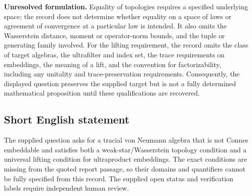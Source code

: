 \documentclass[11pt]{article}
\begin{document}
\textbf{Unresolved formulation.} Equality of topologies requires a specified underlying space; the record does not determine whether equality on a space of laws or agreement of convergence at a particular law is intended. It also omits the Wasserstein distance, moment or operator-norm bounds, and the tuple or generating family involved. For the lifting requirement, the record omits the class of target algebras, the ultrafilter and index set, the trace requirements on embeddings, the meaning of a lift, and the convention for factorizability, including any unitality and trace-preservation requirements. Consequently, the displayed question preserves the supplied target but is not a fully determined mathematical proposition until these qualifications are recovered.
\subsection{Short English statement}
The supplied question asks for a tracial von Neumann algebra that is not Connes embeddable and satisfies both a weak-star/Wasserstein topology condition and a universal lifting condition for ultraproduct embeddings. The exact conditions are missing from the quoted report passage, so their domains and quantifiers cannot be fully specified from this record. The supplied open status and verification labels require independent human review.
\end{document}
